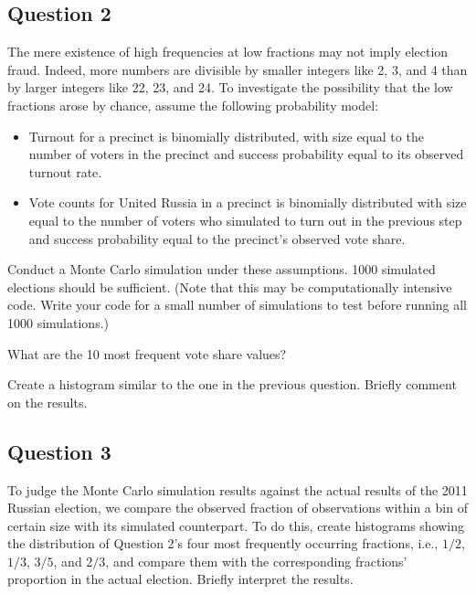 \documentclass[]{article}
\begin{document}
\subsection{Question 2}\label{question-2}

The mere existence of high frequencies at low fractions may not imply
election fraud. Indeed, more numbers are divisible by smaller integers
like 2, 3, and 4 than by larger integers like 22, 23, and 24. To
investigate the possibility that the low fractions arose by chance,
assume the following probability model:

\begin{itemize}
\itemsep1pt\parskip0pt
\item
  Turnout for a precinct is binomially distributed, with size equal to
  the number of voters in the precinct and success probability equal to
  its observed turnout rate.\\
\item
  Vote counts for United Russia in a precinct is binomially distributed
  with size equal to the number of voters who simulated to turn out in
  the previous step and success probability equal to the precinct's
  observed vote share.
\end{itemize}

Conduct a Monte Carlo simulation under these assumptions. 1000 simulated
elections should be sufficient. (Note that this may be computationally
intensive code. Write your code for a small number of simulations to
test before running all 1000 simulations.)

What are the 10 most frequent vote share values?

Create a histogram similar to the one in the previous question. Briefly
comment on the results.

\subsection{Question 3}\label{question-3}

To judge the Monte Carlo simulation results against the actual results
of the 2011 Russian election, we compare the observed fraction of
observations within a bin of certain size with its simulated
counterpart. To do this, create histograms showing the distribution of
Question 2's four most frequently occurring fractions, i.e., $1/2$,
$1/3$, $3/5$, and $2/3$, and compare them with the corresponding
fractions' proportion in the actual election. Briefly interpret the
results.
\end{document}
